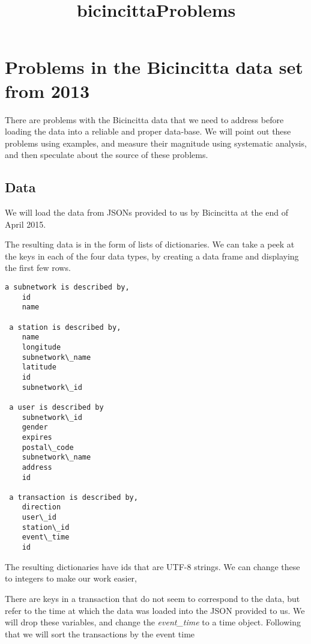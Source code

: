 \documentclass{report}
\title{bicincittaProblems}
\begin{document}
    
    
    
    \maketitle
    
    
    \tableofcontents


    
    \section{Problems in the Bicincitta data set from
2013}\label{problems-in-the-bicincitta-data-set-from-2013}

There are problems with the Bicincitta data that we need to address
before loading the data into a reliable and proper data-base. We will
point out these problems using examples, and measure their magnitude
using systematic analysis, and then speculate about the source of these
problems.

    \subsection{Data}\label{data}

We will load the data from JSONs provided to us by Bicincitta at the end
of April 2015.


    The resulting data is in the form of lists of dictionaries. We can take
a peek at the keys in each of the four data types, by creating a data
frame and displaying the first few rows.


    \begin{Verbatim}[commandchars=\\\{\}]
a subnetwork is described by, 
	id
	name

 a station is described by,
	name
	longitude
	subnetwork\_name
	latitude
	id
	subnetwork\_id

 a user is described by 
	subnetwork\_id
	gender
	expires
	postal\_code
	subnetwork\_name
	address
	id

 a transaction is described by, 
	direction
	user\_id
	station\_id
	event\_time
	id
    \end{Verbatim}

    The resulting dictionaries have ids that are UTF-8 strings. We can
change these to integers to make our work easier,


    There are keys in a transaction that do not seem to correspond to the
data, but refer to the time at which the data was loaded into the JSON
provided to us. We will drop these variables, and change the
\emph{event\_time} to a time object. Following that we will sort the
transactions by the event time
\end{document}
